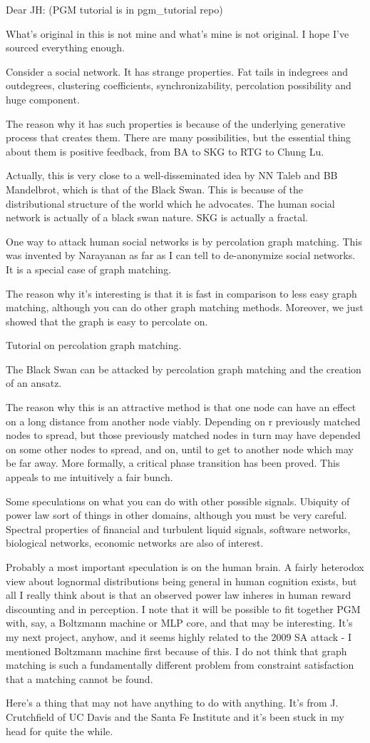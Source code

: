 Dear JH:
(PGM tutorial is in pgm_tutorial repo)

What's original in this is not mine and what's mine is not original. I hope I've sourced everything enough.

Consider a social network. It has strange properties. Fat tails in indegrees and outdegrees, clustering coefficients, synchronizability, percolation possibility and huge component.

The reason why it has such properties is because of the underlying generative process that creates them. There are many possibilities, but the essential thing about them is positive feedback, from BA to SKG to RTG to Chung Lu.

Actually, this is very close to a well-disseminated idea by NN Taleb and BB Mandelbrot, which is that of the Black Swan. This is because of the distributional structure of the world which he advocates. The human social network is actually of a black swan nature. SKG is actually a fractal.

One way to attack human social networks is by percolation graph matching. This was invented by Narayanan as far as I can tell to de-anonymize social networks. It is a special case of graph matching.

The reason why it's interesting is that it is fast in comparison to less easy graph matching, although you can do other graph matching methods. Moreover, we just showed that the graph is easy to percolate on.

Tutorial on percolation graph matching.

The Black Swan can be attacked by percolation graph matching and the creation of an ansatz.

The reason why this is an attractive method is that one node can have an effect on a long distance from another node viably. Depending on r previously matched nodes to spread, but those previously matched nodes in turn may have depended on some other nodes to spread, and on, until to get to another node which may be far away. More formally, a critical phase transition has been proved. This appeals to me intuitively a fair bunch.

Some speculations on what you can do with other possible signals. Ubiquity of power law sort of things in other domains, although you must be very careful. Spectral properties of financial and turbulent liquid signals, software networks, biological networks, economic networks are also of interest.

Probably a most important speculation is on the human brain. A fairly heterodox view about lognormal distributions being general in human cognition exists, but all I really think about is that an observed power law inheres in human reward discounting and in perception. I note that it will be possible to fit together PGM with, say, a Boltzmann machine or MLP core, and that may be interesting. It's my next project, anyhow, and it seems highly related to the 2009 SA attack - I mentioned Boltzmann machine first because of this. I do not think that graph matching is such a fundamentally different problem from constraint satisfaction that a matching cannot be found.

Here's a thing that may not have anything to do with anything. It's from J. Crutchfield of UC Davis and the Santa Fe Institute and it's been stuck in my head for quite the while.
